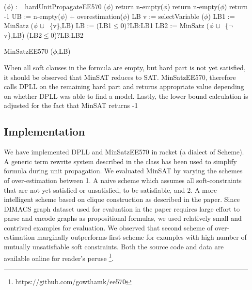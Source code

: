 \begin{algorithm}
 \SetAlgoLined 
 ($\phi$) := hardUnitPropagateEE570 ($\phi$)\;
  {return n-empty($\phi$)}
  {
      {return n-empty($\phi$)}
      {return -1}
 }
 UB := n-empty($\phi$) + overestimation($\phi$)\;
  {\Return LB}
 v := selectVariable ($\phi$)\;
 LB1 := MinSatz ($\phi ~\cup~ $ \{v\},LB)\;
 LB  := (LB1$\le$0)?LB:LB1\;
 LB2 := MinSatz ($\phi ~\cup~ $ \{$\neg$v\},LB)\;
  {\Return (LB2$\le$0)?LB:LB2}
 \caption{MinSatzEE570 ($\phi$,LB)}
\end{algorithm}

When all soft clauses in the formula are empty, but hard part is not yet
satisfied, it should be observed that MinSAT reduces to SAT. MinSatzEE570,
therefore calls DPLL on the remaining hard part and returns appropriate value
depending on whether DPLL was able to find a model. Lastly, the lower bound
calculation is adjusted for the fact that MinSAT returns -1

\subsection{Implementation}
We have implemented DPLL and MinSatzEE570 in racket (a dialect of Scheme). A
generic term rewrite system described in the class has been used to
simplify formula during unit propagation. We evaluated MinSAT by varying the
schemes of over-estimation between 1. A naive scheme which assumes all
soft-constraints that are not yet satisfied or unsatisfied, to be satisfiable,
and 2. A more intelligent scheme based on clique construction as described in
the paper. Since DIMACS graph dataset used for evaluation in the paper requires
large effort to parse and encode graphs as propositional formulas, we used
relatively small and contrived examples for evaluation. We observed that second
scheme of over-estimation marginally outperforms first scheme for examples with
high number of mutually unsatisfiable soft constraints. Both the source code and
data are available online for reader's peruse
\footnote{https://github.com/gowthamk/ee570}.

